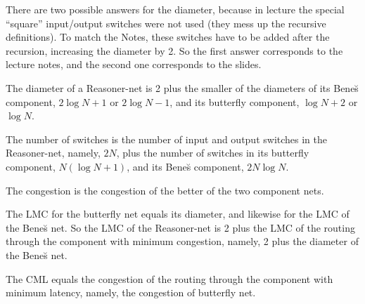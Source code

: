 \begin{problem}
\begin{solution}

There are two possible answers for the diameter, because in lecture the
special ``square'' input/output switches were not used (they mess up the
recursive definitions).  To match the Notes, these switches have to be
added after the recursion, increasing the diameter by 2.  So the first
answer corresponds to the lecture notes, and the second one corresponds to
the slides.

The diameter of a Reasoner-net is 2 plus the smaller of the
diameters of its Bene\u{s} component, $2 \log N + 1$ or $2\log
N-1$, and its butterfly component, $\log N +2$ or $\log N$.

The number of switches is the number of input and output switches in the
Reasoner-net, namely, $2N$, plus the number of switches in its butterfly
component, $N (\log N + 1)$, and its Bene\u{s} component, $2N \log N$.

The congestion is the congestion of the better of the two component nets.

The LMC for the butterfly net equals its diameter, and likewise for the LMC
of the Bene\u{s} net.  So the LMC of the Reasoner-net is 2 plus the LMC of
the routing through the component with minimum congestion, namely, 2 plus
the diameter of the Bene\u{s} net.

The CML equals the congestion of the routing through the component
with minimum latency, namely, the congestion of butterfly net.
\end{solution}

\end{problem}
